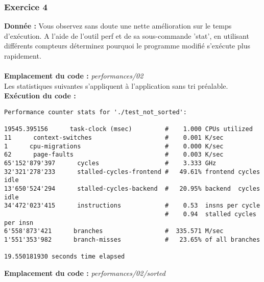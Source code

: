 \subsubsection{Exercice 4}
\textbf{Donnée : } Vous	observez	sans	doute	une	nette	amélioration	sur	le	temps	d'exécution.
A	l'aide	de	l'outil	perf	et	de	sa	sous-commande	'stat',	en	utilisant	différents	compteurs	déterminez	
pourquoi	le	programme	modifié	s'exécute	plus	rapidement.\\\\
\textbf{Emplacement du code : } \textit{performances/02}\\

Les statistiques suivantes s'appliquent à l'application sans tri préalable.
\textbf{Exécution du code : } \\
\begin{lstlisting}
Performance counter stats for './test_not_sorted':

19545.395156      task-clock (msec)         #    1.000 CPUs utilized          
11      context-switches          			#    0.001 K/sec                  
1      cpu-migrations            			#    0.000 K/sec                  
62      page-faults               			#    0.003 K/sec                  
65'152'879'397      cycles                  #    3.333 GHz                    
32'321'278'233      stalled-cycles-frontend #   49.61% frontend cycles idle   
13'650'524'294      stalled-cycles-backend  #   20.95% backend  cycles idle   
34'472'023'415      instructions            #    0.53  insns per cycle        
											#    0.94  stalled cycles per insn
6'558'873'421      branches                 #  335.571 M/sec                  
1'551'353'982      branch-misses            #   23.65% of all branches        

19.550181930 seconds time elapsed
\end{lstlisting}
\textbf{Emplacement du code : } \textit{performances/02/sorted}\\

